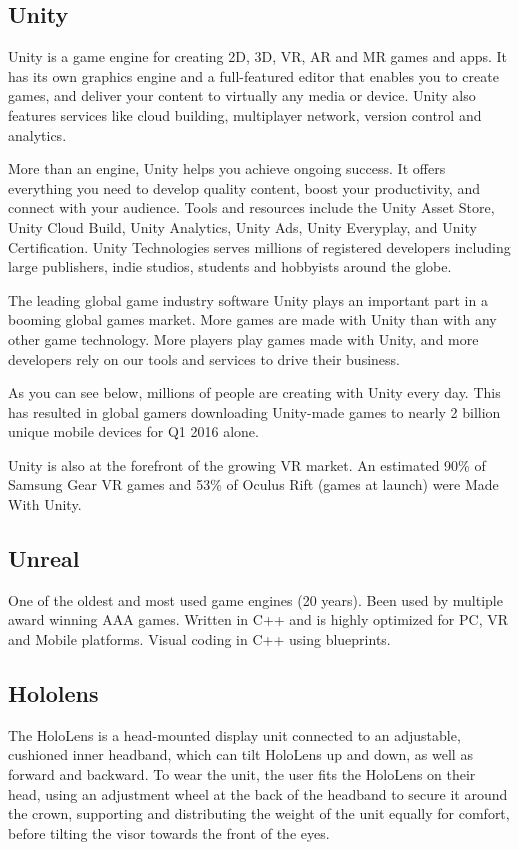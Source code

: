     \subsection{Unity}
    Unity is a game engine for creating 2D, 3D, VR, AR and MR games and apps. It has its own graphics engine and a full-featured editor that enables you to create games, and deliver your content to virtually any media or device. Unity also features services like cloud building, multiplayer network, version control and analytics.

    More than an engine, Unity helps you achieve ongoing success. It offers everything you need to develop quality content, boost your productivity, and connect with your audience. Tools and resources include the Unity Asset Store, Unity Cloud Build, Unity Analytics, Unity Ads, Unity Everyplay, and Unity Certification. Unity Technologies serves millions of registered developers including large publishers, indie studios, students and hobbyists around the globe.
    
    The leading global game industry software
    Unity plays an important part in a booming global games market. More games are made with Unity than with any other game technology. More players play games made with Unity, and more developers rely on our tools and services to drive their business.
    
    As you can see below, millions of people are creating with Unity every day. This has resulted in global gamers downloading Unity-made games to nearly 2 billion unique mobile devices for Q1 2016 alone.
    
    Unity is also at the forefront of the growing VR market. An estimated 90\% of Samsung Gear VR games and 53\% of Oculus Rift (games at launch) were Made With Unity. %
    
    \subsection{Unreal}
    One of the oldest and most used game engines (20 years). Been used by multiple award winning AAA games. Written in C++ and is highly optimized for PC, VR and Mobile platforms.
    Visual coding in C++ using blueprints.

    \subsection{Hololens}
    The HoloLens is a head-mounted display unit connected to an adjustable, cushioned inner headband, which can tilt HoloLens up and down, as well as forward and backward. To wear the unit, the user fits the HoloLens on their head, using an adjustment wheel at the back of the headband to secure it around the crown, supporting and distributing the weight of the unit equally for comfort, before tilting the visor towards the front of the eyes.

